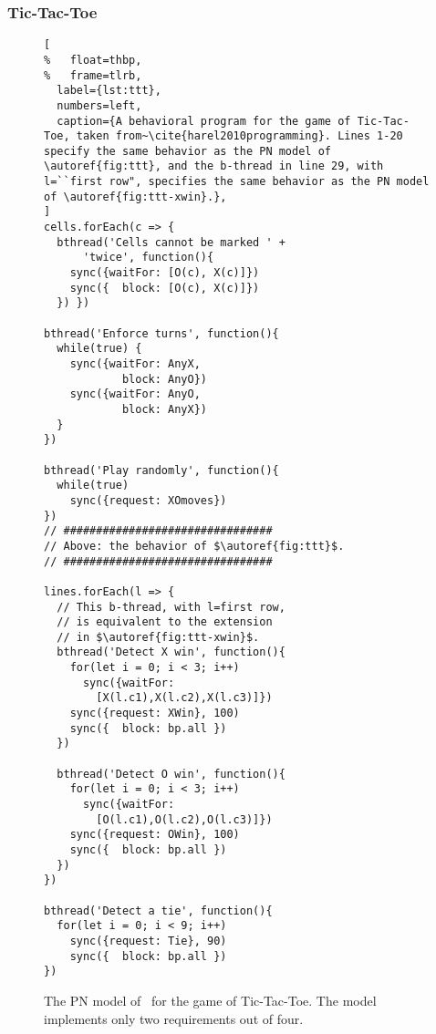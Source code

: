 \documentclass[10pt,journal,compsoc]{IEEEtran}
\theoremstyle{definition}
\begin{document}
\vspace{2em}
\subsubsection{Tic-Tac-Toe}

\begin{figure*}
\begin{minipage}[b]{0.37\textwidth}
\centering
\begin{lstlisting}[
%   float=thbp,
%   frame=tlrb,
  label={lst:ttt},
  numbers=left,
  caption={A behavioral program for the game of Tic-Tac-Toe, taken from~\cite{harel2010programming}. Lines 1-20 specify the same behavior as the PN model of \autoref{fig:ttt}, and the b-thread in line 29, with l=``first row", specifies the same behavior as the PN model of \autoref{fig:ttt-xwin}.},
]
cells.forEach(c => {
  bthread('Cells cannot be marked ' + 
      'twice', function(){
    sync({waitFor: [O(c), X(c)]})
    sync({  block: [O(c), X(c)]})
  }) })
  
bthread('Enforce turns', function(){
  while(true) {
    sync({waitFor: AnyX, 
            block: AnyO})
    sync({waitFor: AnyO, 
            block: AnyX})
  }
})

bthread('Play randomly', function(){
  while(true)
    sync({request: XOmoves})
})
// ################################
// Above: the behavior of $\autoref{fig:ttt}$.
// ################################

lines.forEach(l => {
  // This b-thread, with l=first row,
  // is equivalent to the extension 
  // in $\autoref{fig:ttt-xwin}$.
  bthread('Detect X win', function(){
    for(let i = 0; i < 3; i++)
      sync({waitFor: 
        [X(l.c1),X(l.c2),X(l.c3)]})
    sync({request: XWin}, 100)
    sync({  block: bp.all })
  })
  
  bthread('Detect O win', function(){
    for(let i = 0; i < 3; i++)
      sync({waitFor:
        [O(l.c1),O(l.c2),O(l.c3)]})
    sync({request: OWin}, 100)
    sync({  block: bp.all })
  })
})

bthread('Detect a tie', function(){
  for(let i = 0; i < 9; i++)
    sync({request: Tie}, 90)
    sync({  block: bp.all })
})
\end{lstlisting}
\end{minipage}
\quad
\begin{minipage}[b]{0.6\textwidth}
\centering
    {}
    \caption{The PN model of~\cite{PetriNetDSLblahchain} for the game of Tic-Tac-Toe. The model implements only two requirements out of four.}
    \label{fig:ttt}\vspace{13ex}
  

\end{minipage}
\end{figure*}
\end{document}
